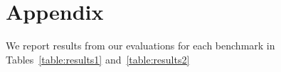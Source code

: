 \section{Appendix}
\label{sec:appendix}
We report results from our evaluations for each benchmark in Tables~\ref{table:results1} and~\ref{table:results2}





